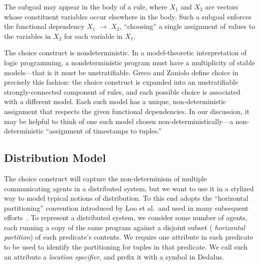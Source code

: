 The subgoal  may appear
in the body of a rule, where \emph{$X_1$} and \emph{$X_2$} are vectors
whose constituent variables occur elsewhere in the body.  Such a
subgoal enforces the functional dependency \emph{$X_1$} $\to$ $X_2$,
``choosing'' a single assignment of values to the variables in
\emph{$X_2$} for each variable in \emph{$X_1$}.

The choice construct is nondeterministic.  In a model-theoretic interpretation of logic programming, a nondeterministic program 
must have a multiplicity of stable models---that is it must be unstratifiable.  Greco and Zaniolo define 
choice in precisely this fashion: the choice construct is expanded into an unstratifiable strongly-connected component of rules, 
and each possible choice is associated with a different model.  Each such model has a unique, non-deterministic assignment that
respects the given functional dependencies.  In our discussion, it may be helpful to think of one such model chosen non-deterministically---a non-deterministic ``assignment of timestamps to tuples.''


\subsection{Distribution Model}
The choice construct will capture the non-determinism of multiple communicating agents in a distributed system, but we want to use it in a stylized way to model typical notions of distribution.  To this end \lang adopts the ``horizontal partitioning'' convention introduced by Loo et al.\ and used in many subsequent efforts~\cite{Loo:2005}.
To represent a distributed system, we consider some number of agents,
each running a copy of the same program against a disjoint subset ({\em
  horizontal partition}) of each predicate's contents.  We require one
attribute in each predicate to be used to identify the
partitioning for tuples in that predicate. We call such an
attribute a {\em location specifier}, and prefix it with a
\dedalus{\#} symbol in Dedalus.

